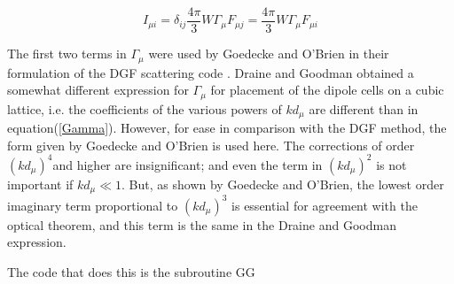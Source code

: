 \documentclass{article}
\begin{document}
\begin{equation}
I_{\mu i}=\delta _{ij}\frac{4\pi }{3}W\Gamma _{\mu }F_{\mu j}=\frac{4\pi }{3}%
W\Gamma _{\mu }F_{\mu i}  \label{ST}
\end{equation}

The first two terms in $\Gamma _{\mu }$ were used by Goedecke and O'Brien in
their formulation of the DGF scattering code \cite{Goedecke88}. Draine and
Goodman obtained a somewhat different expression for $\Gamma _{\mu }$ for
placement of the dipole cells on a cubic lattice\cite{Draine93}, i.e. the
coefficients of the various powers of $kd_{\mu }$ are different than in
equation(\ref{Gamma}). However, for ease in comparison with the DGF method,
the form given by Goedecke and O'Brien is used here. The corrections of
order $\left( kd_{\mu }\right) ^{4}$and higher are insignificant; and even
the term in $\left( kd_{\mu }\right) ^{2}$ is not important if $kd_{\mu }\ll
1.$ But, as shown by Goedecke and O'Brien, the lowest order imaginary term
proportional to $\left( kd_{\mu }\right) ^{3}$ is essential for agreement
with the optical theorem, and this term is the same in the Draine and
Goodman expression.

The code that does this is the subroutine GG

\bigskip
\end{document}
